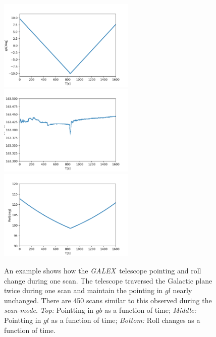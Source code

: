\documentclass[12pt, preprint]{aastex}
\newcommand{\project}[1]{\textsl{#1}}
\newcommand{\galex}{\project{GALEX}}
\newcommand{\scanmode}{\project{scan-mode}}
\begin{document}
\begin{figure}[p]
\begin{center}
\includegraphics[width=0.58\textwidth]{figures/01634_0001-gb}
\includegraphics[width=0.58\textwidth]{figures/01634_0001-gl}
\includegraphics[width=0.58\textwidth]{figures/01634_0001-roll}
\end{center}
\caption{%
  \label{telescope}
  An example shows how the \galex\ telescope pointing and roll change during one scan.
  The telescope traversed the Galactic plane twice during one scan and maintain the pointing in $gl$ nearly unchanged.
  There are 450 scans similar to this observed during the \scanmode. 
  \emph{Top:}  Pointting in $gb$ as a function of time;
  \emph{Middle:} Pointting in $gl$ as a function of time;
  \emph{Bottom:} Roll changes as a function of time.
}
\end{figure}
\end{document}
